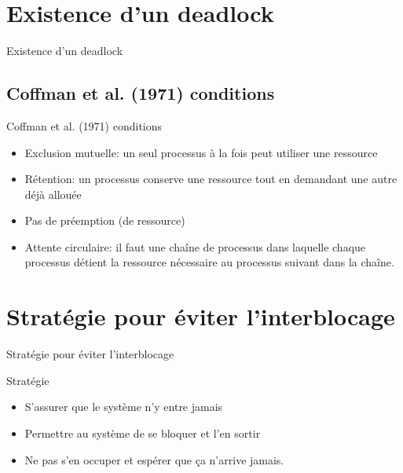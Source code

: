 \def\sectitle{Existence d'un deadlock}
\section{\sectitle}
\begin{frame}{\sectitle}
    \def\subsectitle{Coffman et al. (1971) conditions}
    \subsection{\subsectitle}
    \begin{block}{\subsectitle}
        \begin{itemize}
            \item Exclusion mutuelle: un seul processus à la fois peut utiliser une
                ressource
            \item Rétention: un processus conserve une ressource tout en demandant une
                autre déjà allouée
            \item Pas de préemption (de ressource)
            \item Attente circulaire: il faut une chaîne de processus dans laquelle
                chaque processus détient la ressource nécessaire au processus suivant dans
                la chaîne.
        \end{itemize}
    \end{block}
\end{frame}

\def\sectitle{Stratégie pour éviter l'interblocage}
\section{\sectitle}
\begin{frame}{\sectitle}
    \def\subsectitle{Stratégie}
    \begin{block}{\subsectitle}
        \begin{itemize}
            \item S'assurer que le système n'y entre jamais
            \item Permettre au système de se bloquer et l'en sortir
            \item Ne pas s'en occuper et espérer que ça n'arrive jamais.
        \end{itemize}
    \end{block}
\end{frame}

\def\sectitle{Prévention}
